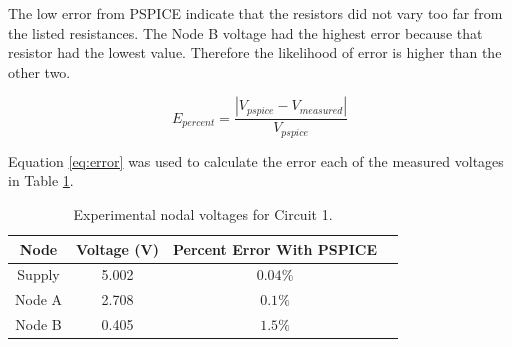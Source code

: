 \documentclass[11pt]{article}
\begin{document}


The low error from PSPICE indicate that the resistors did not vary too far from the listed resistances. The Node B voltage had the highest error because that resistor had the lowest value. Therefore the likelihood of error is higher than the other two.

\begin{equation}
\label{eq:error}
E_{percent} = \frac{|V_{pspice} - V_{measured}|}{V_{pspice}}
\end{equation}

Equation \ref{eq:error} was used to calculate the error each of the measured voltages in Table \ref{Table:ResultsCircuit1}.

\begin{table}[h!]
	\caption{Experimental nodal voltages for Circuit 1.}
	\begin{center}
		\begin{tabular}{|c||c|c|c|}
			\hline
		Node & Voltage (\si{\volt}) & Percent Error With PSPICE \\
		\hline
		Supply & 5.002 & $0.04 \percent$\\	 
		\hline 
		Node A & 2.708 & $0.1\percent$\\	 
		\hline
		Node B & 0.405 & $1.5\percent$\\	 
		\hline			
		\end{tabular}
	\end{center}
	\label{Table:ResultsCircuit1}
\end{table}
\end{document}

